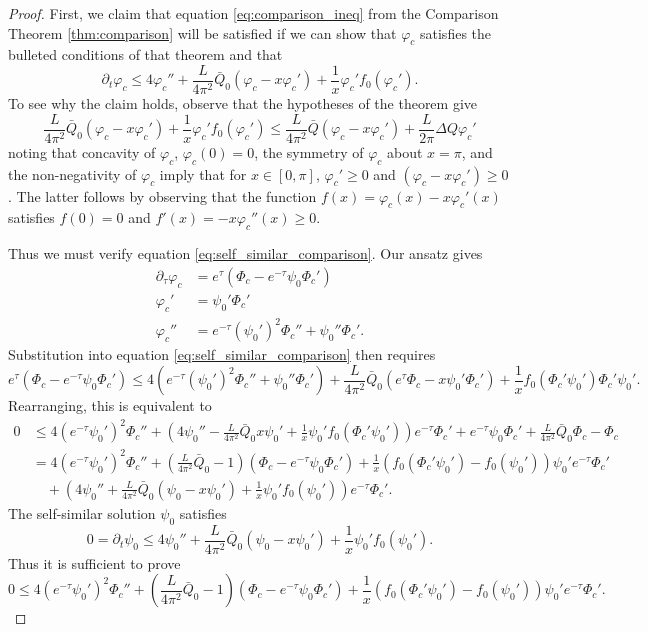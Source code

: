 \documentclass[12pt]{amsart}
\begin{document}
\begin{proof}
First, we claim that equation \eqref{eq:comparison_ineq} from the Comparison Theorem \ref{thm:comparison} will be satisfied if we can show that $\varphi_c$ satisfies the bulleted conditions of that theorem and that
\begin{equation}
\label{eq:self_similar_comparison}
\partial_t \varphi_c \leq 4 \varphi_c'' + \frac{L}{4\pi^2} \bar{Q}_0 (\varphi_c - x\varphi_c') + \frac{1}{x} \varphi_c' f_0 (\varphi_c').
\end{equation}
To see why the claim holds, observe that the hypotheses of the theorem give
\[
\frac{L}{4\pi^2} \bar{Q}_0 (\varphi_c - x\varphi_c') + \frac{1}{x} \varphi_c' f_0 (\varphi_c') \leq \frac{L}{4\pi^2} \bar{Q} (\varphi_c - x\varphi_c') + \frac{L}{2\pi} \Delta Q \varphi_c'
\]
noting that concavity of $\varphi_c$, $\varphi_c(0) = 0$, the symmetry of $\varphi_c$ about $x=\pi$, and the non-negativity of $\varphi_c$ imply that for $x \in [0, \pi]$, $\varphi_c' \geq 0$ and $(\varphi_c - x \varphi_c') \geq 0$. The latter follows by observing that the function $f(x) = \varphi_c(x) - x \varphi_c'(x)$ satisfies $f(0) = 0$ and $f'(x) = -x \varphi_c''(x) \geq 0$.

Thus we must verify equation \eqref{eq:self_similar_comparison}. Our ansatz gives
\begin{align*}
\partial_{\tau} \varphi_c &= e^{\tau} \left(\Phi_c - e^{-\tau} \psi_0 \Phi_c'\right) \\
\varphi_c' &= \psi_0' \Phi_c' \\
\varphi_c'' &= e^{-\tau} (\psi_0')^2 \Phi_c'' + \psi_0'' \Phi_c'.
\end{align*}
Substitution into equation \eqref{eq:self_similar_comparison} then requires
\[
e^{\tau} \left(\Phi_c - e^{-\tau} \psi_0 \Phi_c'\right) \leq 4 \left(e^{-\tau} (\psi_0')^2 \Phi_c'' + \psi_0'' \Phi_c'\right) + \frac{L}{4\pi^2} \bar{Q}_0 (e^{\tau} \Phi_c - x \psi_0' \Phi_c') + \frac{1}{x} f_0(\Phi_c' \psi_0') \Phi_c' \psi_0'.
\]
Rearranging, this is equivalent to
\[
\begin{split}
0 &\leq 4 (e^{-\tau} \psi_0')^2 \Phi_c'' + \left(4\psi_0'' - \frac{L}{4\pi^2} \bar{Q}_0 x \psi_0' + \frac{1}{x} \psi_0'f_0(\Phi_c' \psi_0') \right) e^{-\tau} \Phi_c' + e^{-\tau} \psi_0 \Phi_c' + \frac{L}{4\pi^2} \bar{Q}_0 \Phi_c - \Phi_c \\
&= 4 (e^{-\tau} \psi_0')^2 \Phi_c'' + \left(\frac{L}{4\pi^2} \bar{Q}_0 - 1\right) \left(\Phi_c - e^{-\tau} \psi_0 \Phi_c'\right) + \frac{1}{x} \left(f_0(\Phi_c' \psi_0') - f_0(\psi_0')\right) \psi_0' e^{-\tau} \Phi_c'\\
&\quad + \left(4\psi_0'' + \frac{L}{4\pi^2} \bar{Q}_0 (\psi_0 - x \psi_0') + \frac{1}{x} \psi_0' f_0(\psi_0')\right) e^{-\tau} \Phi_c'.
\end{split}
\]
The self-similar solution $\psi_0$ satisfies
\[
0 = \partial_t \psi_0 \leq 4\psi_0'' + \frac{L}{4\pi^2} \bar{Q}_0 (\psi_0 - x \psi_0') + \frac{1}{x} \psi_0' f_0(\psi_0').
\]
Thus it is sufficient to prove
\[
0 \leq 4 (e^{-\tau} \psi_0')^2 \Phi_c'' + \left(\frac{L}{4\pi^2} \bar{Q}_0 - 1\right) \left(\Phi_c - e^{-\tau} \psi_0 \Phi_c'\right) + \frac{1}{x} \left(f_0(\Phi_c' \psi_0') - f_0(\psi_0')\right) \psi_0' e^{-\tau} \Phi_c'.
\]


\end{proof}
\end{document}
